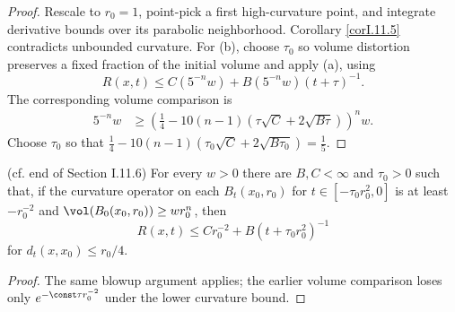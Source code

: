 \begin{proof}
\sketch Rescale to $r_0=1$, point-pick a first high-curvature point, and
integrate derivative bounds over its parabolic neighborhood.  Corollary
\ref{corI.11.5} contradicts unbounded curvature.  For (b), choose $\tau_0$
so volume distortion preserves a fixed fraction of the initial volume and
apply (a), using
\begin{equation}\label{cc}
R(x,t)\leq C(5^{-n}w)+B(5^{-n}w)(t+\tau)^{-1}.
\end{equation}
The corresponding volume comparison is
\begin{align}\label{lll}
5^{-n}w&\geq
\left(\frac14-10(n-1)(\tau\sqrt C+2\sqrt{B\tau})\right)^n w.
\end{align}
Choose $\tau_0$ so that
$\frac14-10(n-1)(\tau_0\sqrt C+2\sqrt{B\tau_0})=\frac15$.
\end{proof}
\begin{corollary}
\label{cor:kl-curvature-bounds-ricci-flow-solutions-nonnegative-curvature-operator-ass-existence-curvature-operators-3}

(cf. end of Section I.11.6)\label{I.11.6end}
For every $w>0$ there are $B,C<\infty$ and $\tau_0>0$ such that, if the
curvature operator on each $B_t(x_0,r_0)$ for
$t\in[-\tau_0r_0^2,0]$ is at least $-r_0^{-2}$ and
$\vol(B_0(x_0,r_0))\geq wr_0^n$, then
\[
R(x,t)\leq Cr_0^{-2}+B(t+\tau_0r_0^2)^{-1}
\]
for $d_t(x,x_0)\leq r_0/4$.
\end{corollary}
\begin{proof}
\sketch The same blowup argument applies; the earlier volume comparison loses
only $e^{-\const\tau r_0^{-2}}$ under the lower curvature bound.
\end{proof}

